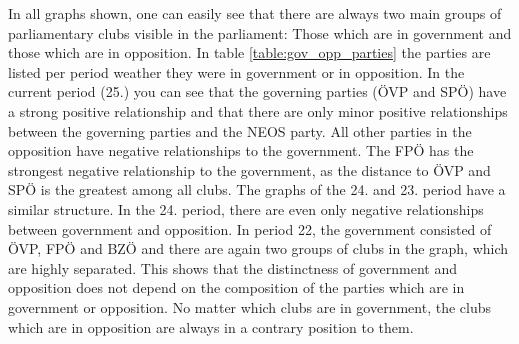 In all graphs shown, one can easily see that there are always two main groups of parliamentary clubs visible in the parliament: Those which are in government and those which are in opposition. In table \ref{table:gov_opp_parties} the parties are listed per period weather they were in government or in opposition. 
In the current period (25.) you can see that the governing parties (ÖVP and SPÖ) have a strong positive relationship and that there are only minor positive relationships between the governing parties and the NEOS party. All other parties in the opposition have negative relationships to the government. The FPÖ has the strongest negative relationship to the government, as the distance to ÖVP and SPÖ is the greatest among all clubs. The graphs of the 24. and 23. period have a similar structure. In the 24. period, there are even only negative relationships between government and opposition. In period 22, the government consisted of ÖVP, FPÖ and BZÖ and there are again two groups of clubs in the graph, which are highly separated. This shows that the distinctness of government and opposition does not depend on the composition of the parties which are in government or opposition. No matter which clubs are in government, the clubs which are in opposition are always in a contrary position to them.

